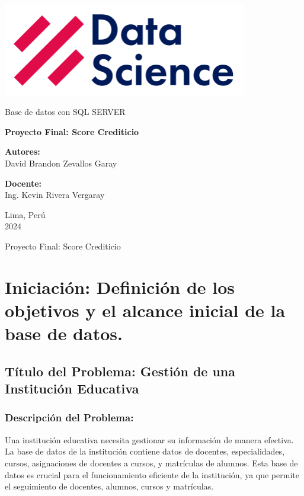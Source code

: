 \documentclass[10pt]{article}
\begin{document}
\begin{titlepage}
    \centering
    \vspace*{1cm}
    
    \includegraphics[width=0.8\textwidth]{images/logo.png}
    
    \vspace{0.5cm}
    {\Large Base de datos con SQL SERVER}
    
    \vspace{1.5cm}
    {\LARGE\bfseries Proyecto Final: Score Crediticio}
    
    \vspace{2cm}
    \textbf{Autores:}\\
    David Brandon Zevallos Garay


    \vspace{0.5cm}
    \textbf{Docente:}\\
    Ing. Kevin Rivera Vergaray
    
    \vspace{2cm}
    Lima, Perú\\
    2024
    
    \vfill
    Proyecto Final: Score Crediticio
\end{titlepage}

\tableofcontents
\newpage

\section{Iniciación: Definición de los objetivos y el alcance inicial de la base de datos.}

\subsection{Título del Problema: Gestión de una Institución Educativa}
\subsubsection{Descripción del Problema:}
Una institución educativa necesita gestionar su información de manera efectiva. La base de datos de la institución contiene datos de docentes, especialidades, cursos, asignaciones de docentes a cursos, y matrículas de alumnos. Esta base de datos es crucial para el funcionamiento eficiente de la institución, ya que permite el seguimiento de docentes, alumnos, cursos y matrículas.
\end{document}
